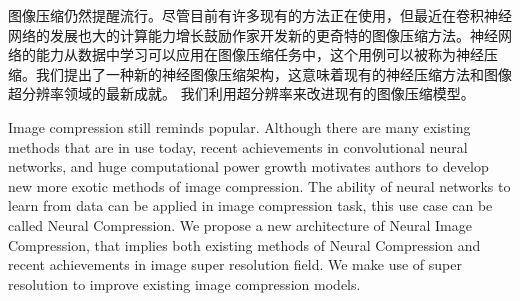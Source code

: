 
\begin{cabstract}
图像压缩仍然提醒流行。尽管目前有许多现有的方法正在使用，但最近在卷积神经网络的发展也大的计算能力增长鼓励作家开发新的更奇特的图像压缩方法。神经网络的能力从数据中学习可以应用在图像压缩任务中，这个用例可以被称为神经压缩。我们提出了一种新的神经图像压缩架构，这意味着现有的神经压缩方法和图像超分辨率领域的最新成就。 我们利用超分辨率来改进现有的图像压缩模型。
\end{cabstract}

\begin{eabstract}
Image compression still reminds popular. Although there are many existing methods that are in use today, recent achievements in convolutional neural networks, and huge computational power growth motivates authors to develop new more exotic methods of image compression. The ability of neural networks to learn from data can be applied in image compression task, this use case can be called Neural Compression. We propose a new architecture of Neural Image Compression, that implies both existing methods of Neural Compression and recent achievements in image super resolution field. We make use of super resolution to improve existing image compression models.
\end{eabstract}